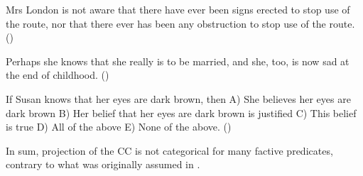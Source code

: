 \documentclass[11pt,fleqn]{article}
\newcommand{\6}{\mbox{$[\hspace*{-.6mm}[$}}
\newcommand{\9}{\mbox{$]\hspace*{-.6mm}]$}}
\begin{document}
\begin{exe}
\ex\label{nat2}

\begin{xlist}

\ex Mrs London is not aware that there have ever been signs erected to stop use of the route, nor that there ever has been  any obstruction to stop use of the route. \hfill (\citealt[83]{beaver-belly})

\ex Perhaps she knows that she really is to be married, and she, too, is now sad at the end of childhood. \hfill (\citealt[86]{beaver-belly})

\ex If Susan knows that her eyes are dark brown, then A) She believes her eyes are dark brown B) Her belief that her eyes are dark brown is justified C) This belief is true D) All of the above E) None of the above. \hfill (\citealt[84]{beaver-belly})

\end{xlist}
\end{exe}
In sum, projection of the CC is not categorical for many factive predicates, contrary to what was originally assumed in \citealt{kiparsky-kiparsky70}. 
\end{document}
